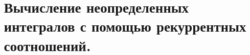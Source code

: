 \documentclass[../main.tex]{subfiles}
\begin{document}
\newpage
\section{Вычисление неопределенных интегралов с помощью рекуррентных соотношений.}
\end{document}
